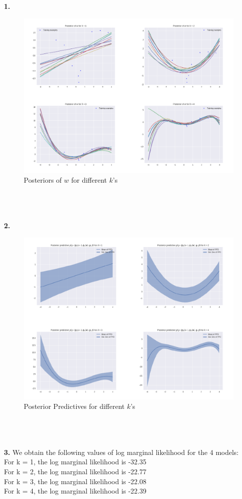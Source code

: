 \documentclass[a4paper,11pt]{article}
\begin{document}
\begin{pmisolution}

\textbf{1.} 
\begin{figure}[H]
    \centering
    \includegraphics[width=\linewidth]{"posterior.pdf"}
    \caption{Posteriors of $w$ for different $k$'s}
    \label{fig:posterior}
\end{figure}
\\ \\ \\
\textbf{2.} 
\begin{figure}[H]
    \centering
    \includegraphics[width=\linewidth]{"ppd.pdf"}
    \caption{Posterior Predictives for different $k$'s}
    \label{fig:ppd}
\end{figure}
\\ \\ \\
\noindent \textbf{3.} We obtain the following values of log marginal likelihood for the 4 models: \\
For k = 1, the log marginal likelihood is -32.35 \\
For k = 2, the log marginal likelihood is -22.77 \\
For k = 3, the log marginal likelihood is -22.08 \\
For k = 4, the log marginal likelihood is -22.39 \\


\end{pmisolution}
\end{document}
